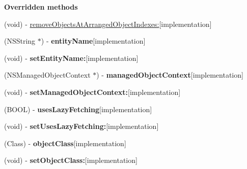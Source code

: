 \begin{Indent}{\bf Overridden methods}
\begin{DoxyCompactItemize}
\item 
(void) -\/ \hyperlink{interface_b_x_synchronized_array_controller_a66992377b65b676a3ae2ba37a1605787}{remove\+Objects\+At\+Arranged\+Object\+Indexes\+:}{\ttfamily  \mbox{[}implementation\mbox{]}}
\item 
\hypertarget{interface_b_x_synchronized_array_controller_a8398e7617bb0166330384b1db8b2008a}{}(N\+S\+String $\ast$) -\/ {\bfseries entity\+Name}{\ttfamily  \mbox{[}implementation\mbox{]}}\label{interface_b_x_synchronized_array_controller_a8398e7617bb0166330384b1db8b2008a}

\item 
\hypertarget{interface_b_x_synchronized_array_controller_a53199301ebf0ce4125af52d48b0468cf}{}(void) -\/ {\bfseries set\+Entity\+Name\+:}{\ttfamily  \mbox{[}implementation\mbox{]}}\label{interface_b_x_synchronized_array_controller_a53199301ebf0ce4125af52d48b0468cf}

\item 
\hypertarget{interface_b_x_synchronized_array_controller_a3840c893f7918089c86bc7983f65f827}{}(N\+S\+Managed\+Object\+Context $\ast$) -\/ {\bfseries managed\+Object\+Context}{\ttfamily  \mbox{[}implementation\mbox{]}}\label{interface_b_x_synchronized_array_controller_a3840c893f7918089c86bc7983f65f827}

\item 
\hypertarget{interface_b_x_synchronized_array_controller_aa197a6417278d29f13df6dc20fb284f5}{}(void) -\/ {\bfseries set\+Managed\+Object\+Context\+:}{\ttfamily  \mbox{[}implementation\mbox{]}}\label{interface_b_x_synchronized_array_controller_aa197a6417278d29f13df6dc20fb284f5}

\item 
\hypertarget{interface_b_x_synchronized_array_controller_a574ca645df789870864cc047ecb689db}{}(B\+O\+O\+L) -\/ {\bfseries uses\+Lazy\+Fetching}{\ttfamily  \mbox{[}implementation\mbox{]}}\label{interface_b_x_synchronized_array_controller_a574ca645df789870864cc047ecb689db}

\item 
\hypertarget{interface_b_x_synchronized_array_controller_aa557f665ea0d01c456f612969d76e63a}{}(void) -\/ {\bfseries set\+Uses\+Lazy\+Fetching\+:}{\ttfamily  \mbox{[}implementation\mbox{]}}\label{interface_b_x_synchronized_array_controller_aa557f665ea0d01c456f612969d76e63a}

\item 
\hypertarget{interface_b_x_synchronized_array_controller_a9039caba64d8794080fcbe574323ecb0}{}(Class) -\/ {\bfseries object\+Class}{\ttfamily  \mbox{[}implementation\mbox{]}}\label{interface_b_x_synchronized_array_controller_a9039caba64d8794080fcbe574323ecb0}

\item 
\hypertarget{interface_b_x_synchronized_array_controller_abf651553a326c3b86a3b88bd965febe9}{}(void) -\/ {\bfseries set\+Object\+Class\+:}{\ttfamily  \mbox{[}implementation\mbox{]}}\label{interface_b_x_synchronized_array_controller_abf651553a326c3b86a3b88bd965febe9}

\end{DoxyCompactItemize}
\end{Indent}

